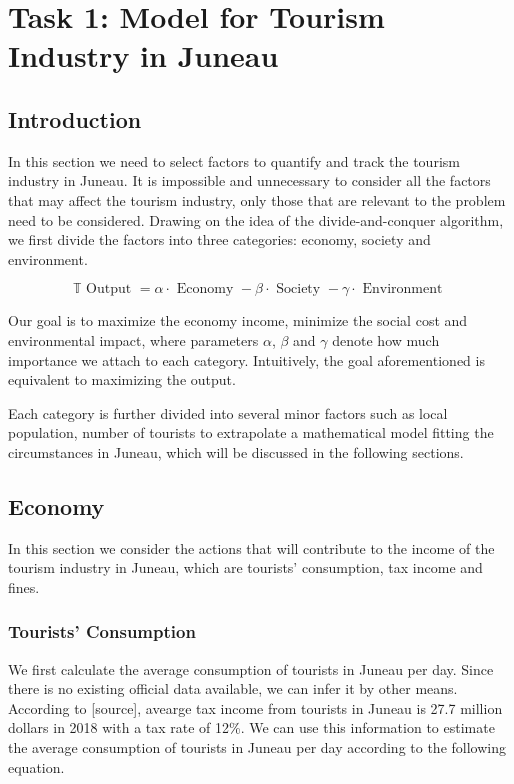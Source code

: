 \section{Task 1: Model for Tourism Industry in Juneau}

\subsection{Introduction}


In this section we need to select factors to quantify and track the tourism industry in Juneau. 
It is impossible and unnecessary to consider all the factors that may affect the 
tourism industry, only those that are relevant to the problem need to be considered.
Drawing on the idea of the divide-and-conquer algorithm, we first divide the factors 
into three categories: economy, society and environment. 


\begin{equation}
    \mathbb{T}\text { Output }=\alpha \cdot \text { Economy }-\beta \cdot \text { Society }-\gamma \cdot \text { Environment }
\end{equation}

Our goal is to maximize the economy income, minimize the social cost and environmental impact,
where parameters $\alpha$, $\beta$ and $\gamma$ denote how much importance we attach to each category.
Intuitively, the goal aforementioned is equivalent to maximizing the output.

Each category is further divided into several minor factors such as local population, 
number of tourists to extrapolate a mathematical model fitting the circumstances in Juneau,
which will be discussed in the following sections.





\subsection{Economy}

In this section we consider the actions that will contribute to the income of the tourism industry in Juneau, which are
tourists' consumption, tax income and fines.

\subsubsection{Tourists' Consumption}

We first calculate the average consumption of tourists in Juneau per day. Since there is no existing official data available, 
we can infer it by other means. According to [source], avearge tax income from tourists in Juneau is 27.7 million dollars in 2018
with a tax rate of 12\%. We can use this information to estimate the average consumption of tourists in Juneau per day according to 
the following equation.

